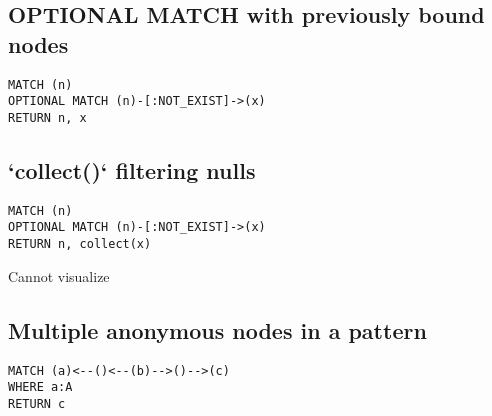 \subsection{OPTIONAL MATCH with previously bound nodes}

\begin{lstlisting}
MATCH (n)
OPTIONAL MATCH (n)-[:NOT_EXIST]->(x)
RETURN n, x
\end{lstlisting}

\subsection{`collect()` filtering nulls}

\begin{lstlisting}
MATCH (n)
OPTIONAL MATCH (n)-[:NOT_EXIST]->(x)
RETURN n, collect(x)
\end{lstlisting}

Cannot visualize
\subsection{Multiple anonymous nodes in a pattern}

\begin{lstlisting}
MATCH (a)<--()<--(b)-->()-->(c)
WHERE a:A
RETURN c
\end{lstlisting}

